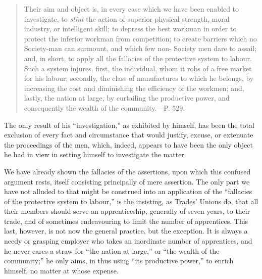 \begin{quote}
    \hspace{2em} Their aim and object is, in every case which we have
    been enabled to investigate, to \textit{stint} the action of
    superior physical strength, moral industry, or intelligent skill; to
    depress the best workman in order to protect the inferior workman
    from competition; to create barriers which no Society-man can
    surmount, and which few non- Society men dare to assail; and, in
    short, to apply all the fallacies of the protective system to
    labour. Such a system injures, first, the individual, whom it robs
    of a free market for his labour; secondly, the class of manufactures
    to which he belongs, by increasing the cost and diminishing the
    efficiency of the workmen; and, lastly, the nation at large, by
    curtailing the productive power, and consequently the wealth of the
    community.---P. 529.
\end{quote}

The only result of his ``investigation,'' as exhibited by himself, has
been the total exclusion of every fact and circumstance that would
justify, excuse, or extenuate the proceedings of the men, which, indeed,
appears to have been the only object he had in view in setting himself
to investigate the matter.

We have already shown the fallacies of the assertions, upon which this
confused argument rests, itself consisting principally of mere
assertion. The only part we have not alluded to that might be construed
into an application of the ``fallacies of the protective system to
labour,'' is the insisting, as Trades' Unions do, that all their members
should serve an apprenticeship, generally of seven years, to their
trade, and of sometimes endeavouring to limit the number of apprentices.
This last, however, is not now the general practice, but the exception.
It is always a needy or grasping employer who takes an inordinate number
of apprentices, and he never cares a straw for ``the nation at large,''
or ``the wealth of the community;'' he only aims, in thus using ``its
productive power,'' to enrich himself, no matter at whose expense.

